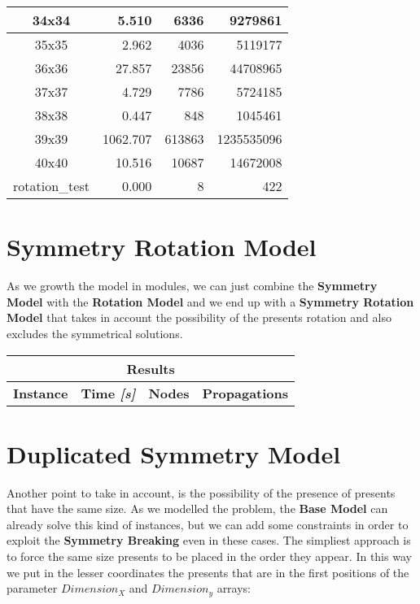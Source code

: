 \begin{center}
\begin{tabular}{|c|r|r|r|}
        34x34 & 5.510 & 6336 & 9279861 \\ \hline
        35x35 & 2.962 & 4036 & 5119177 \\ \hline
        36x36 & 27.857 & 23856 & 44708965 \\ \hline
        37x37 & 4.729 & 7786 & 5724185 \\ \hline
        38x38 & 0.447 & 848 & 1045461 \\ \hline
        39x39 & 1062.707 & 613863 & 1235535096 \\ \hline
        40x40 & 10.516 & 10687 & 14672008 \\ \hline
        rotation_test & 0.000 & 8 & 422 \\ \hline
    \end{tabular}
\end{center}

\section{Symmetry Rotation Model}
As we growth the model in modules, we can just combine the \textbf{Symmetry Model} with the \textbf{Rotation Model} and we end up
with a \textbf{Symmetry Rotation Model} that takes in account the possibility of the presents rotation and also excludes the symmetrical
solutions.

\begin{center}
    \begin{tabular}{|c|c|c|c|}
        \hline
        \multicolumn{4}{|c|}{\textbf{Results}} \\
        \hline
        \textbf{Instance} & \textbf{Time \textit{[s]}} & \textbf{Nodes} & \textbf{Propagations} \\
        \hline
    \end{tabular}
\end{center}

\section{Duplicated Symmetry Model}
Another point to take in account, is the possibility of the presence of presents that have the same size. As we modelled the problem,
the \textbf{Base Model} can already solve this kind of instances, but we can add some constraints in order to exploit the \textbf{Symmetry Breaking}
even in these cases. The simpliest approach is to force the same size presents to be placed in the order they appear. In this way we put in the lesser
coordinates the presents that are in the first positions of the parameter $Dimension_X$ and $Dimension_y$ arrays:\\

